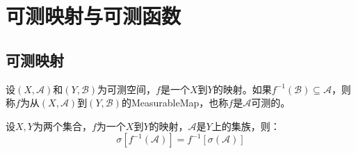 \section{可测映射与可测函数}
\subsection{可测映射}
\begin{definition}
	设$(X,\mathscr{A})$和$(Y,\mathscr{B})$为可测空间，$f$是一个$X$到$Y$的映射。如果$f^{-1}(\mathscr{B})\subseteq\mathscr{A}$，则称$f$为从$(X,\mathscr{A})$到$(Y,\mathscr{B})$的\gls{MeasurableMap}，也称$f$是$\mathscr{A}$可测的。
\end{definition}
\begin{lemma}\label{lem:PreimageSigmaField}
	设$X,Y$为两个集合，$f$为一个$X$到$Y$的映射，$\mathscr{A}$是$Y$上的集族，则：
	\begin{equation*}
		\sigma[f^{-1}(\mathscr{A})]=f^{-1}[\sigma(\mathscr{A})]
	\end{equation*}
\end{lemma}

